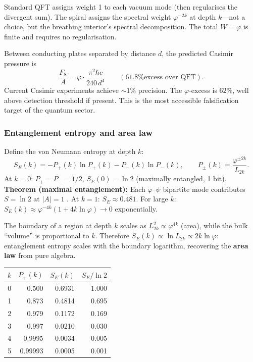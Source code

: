 \documentclass[12pt,a4paper]{article}
\begin{document}
Standard QFT assigns weight 1 to each vacuum mode (then regularises the divergent sum).  The spiral assigns the spectral weight $\varphi^{-2k}$ at depth $k$---not a choice, but the breathing interior's spectral decomposition.  The total $W = \varphi$ is finite and requires no regularisation.

Between conducting plates separated by distance $d$, the predicted Casimir pressure is
\begin{equation}
\boxed{\frac{F_{\mathrm{S}}}{A} = \varphi \cdot \frac{\pi^2\hbar c}{240\,d^4}} \qquad (\text{61.8\% excess over QFT}).
\end{equation}
Current Casimir experiments achieve $\sim 1\%$ precision.  The $\varphi$-excess is $62\%$, well above detection threshold if present.  This is the most accessible falsification target of the quantum sector.

\subsubsection{Entanglement entropy and area law}
\label{sec:entanglement-entropy}

Define the von Neumann entropy at depth $k$:
\begin{equation}
S_E(k) = -P_+(k)\ln P_+(k) - P_-(k)\ln P_-(k), \qquad P_\pm(k) = \frac{\varphi^{\pm 2k}}{L_{2k}}.
\end{equation}
At $k = 0$: $P_+ = P_- = 1/2$, $S_E(0) = \ln 2$ (maximally entangled, 1 bit). \textbf{Theorem (maximal entanglement):} Each $\varphi$--$\psi$ bipartite mode contributes $S = \ln 2$ at $|A| = 1$ \label{thm:max-entanglement}.  At $k = 1$: $S_E \approx 0.481$.  For large $k$: $S_E(k) \approx \varphi^{-4k}(1 + 4k\ln\varphi) \to 0$ exponentially.

The boundary of a region at depth $k$ scales as $L_{2k}^2 \propto \varphi^{4k}$ (area), while the bulk ``volume'' is proportional to $k$.  Therefore $S_E(k) \propto \ln L_{2k} \propto 2k\ln\varphi$: entanglement entropy scales with the boundary logarithm, recovering the \textbf{area law} from pure algebra.

\begin{center}
\small
\begin{tabular}{|c|r|r|r|}
\hline
$k$ & $P_+(k)$ & $S_E(k)$ & $S_E / \ln 2$ \\
\hline
0 & 0.500 & 0.6931 & 1.000 \\
1 & 0.873 & 0.4814 & 0.695 \\
2 & 0.979 & 0.1172 & 0.169 \\
3 & 0.997 & 0.0210 & 0.030 \\
4 & 0.9995 & 0.0034 & 0.005 \\
5 & 0.99993 & 0.0005 & 0.001 \\
\hline
\end{tabular}
\end{center}
\end{document}
